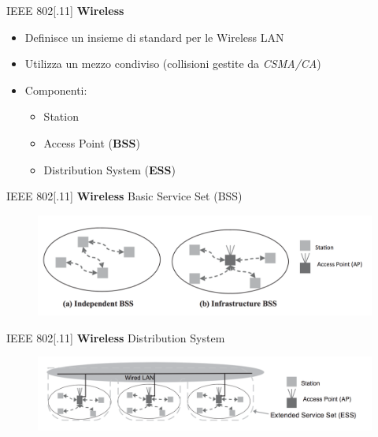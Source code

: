 \begin{frame}{IEEE 802[.11]}
	\textbf{Wireless}
	\begin{itemize}[<+- | alert@+>]
		\item Definisce un insieme di standard per le Wireless LAN
		\item Utilizza un mezzo condiviso (collisioni gestite da \textit{CSMA/CA})
		\item Componenti:
			\begin{itemize}
				\item Station
				\item Access Point (\textbf{BSS})
				\item Distribution System (\textbf{ESS})
			\end{itemize}
	\end{itemize}
\end{frame}
\begin{frame}{IEEE 802[.11]}
	\textbf{Wireless}
	\newline
	Basic Service Set (BSS)
		\begin{figure}[h] 
			\includegraphics[scale=0.3,cfbox=blue_slides 1pt 0pt]{imgs/bss.png}
		\end{figure}
	\end{frame}
	\begin{frame}{IEEE 802[.11]}
	\textbf{Wireless}
	\newline
	Distribution System
		\begin{figure}[h] 
			\includegraphics[scale=0.3,cfbox=blue_slides 1pt 0pt]{imgs/ds.png} %
		\end{figure}
\end{frame}
	
